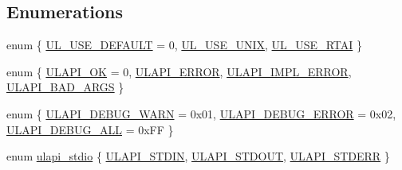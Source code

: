 \subsection*{Enumerations}
\begin{DoxyCompactItemize}
\item 
enum \{ \hyperlink{ulapi_8hh_a06fc87d81c62e9abb8790b6e5713c55ba27b52d695698881384f23e88795fa688}{UL\_\-USE\_\-DEFAULT} =  0, 
\hyperlink{ulapi_8hh_a06fc87d81c62e9abb8790b6e5713c55bad498b6be6030a0250ad5baf641515775}{UL\_\-USE\_\-UNIX}, 
\hyperlink{ulapi_8hh_a06fc87d81c62e9abb8790b6e5713c55baef402ddc600d279d3b50110a8033f22e}{UL\_\-USE\_\-RTAI}
 \}
\item 
enum \{ \hyperlink{ulapi_8hh_adf764cbdea00d65edcd07bb9953ad2b7a45185f329ea15aa7a15d7153956e8e8b}{ULAPI\_\-OK} =  0, 
\hyperlink{ulapi_8hh_adf764cbdea00d65edcd07bb9953ad2b7a0d49444592f72eceb55ce10caac632e0}{ULAPI\_\-ERROR}, 
\hyperlink{ulapi_8hh_adf764cbdea00d65edcd07bb9953ad2b7a61d1acf086e7dcaa5efe3532096e8661}{ULAPI\_\-IMPL\_\-ERROR}, 
\hyperlink{ulapi_8hh_adf764cbdea00d65edcd07bb9953ad2b7a30ff306ab59b410e5c86aef3728cdf81}{ULAPI\_\-BAD\_\-ARGS}
 \}
\item 
enum \{ \hyperlink{ulapi_8hh_a99fb83031ce9923c84392b4e92f956b5a37642631e7d37af27695dc0d3169c889}{ULAPI\_\-DEBUG\_\-WARN} =  0x01, 
\hyperlink{ulapi_8hh_a99fb83031ce9923c84392b4e92f956b5a700cc5844df13377374936342ac9f842}{ULAPI\_\-DEBUG\_\-ERROR} =  0x02, 
\hyperlink{ulapi_8hh_a99fb83031ce9923c84392b4e92f956b5a89bf7a468c86ac28240c2e9dccf49b9d}{ULAPI\_\-DEBUG\_\-ALL} =  0xFF
 \}
\item 
enum \hyperlink{ulapi_8hh_a29ec6f0aae96259128c9e278adb6aa19}{ulapi\_\-stdio} \{ \hyperlink{ulapi_8hh_a29ec6f0aae96259128c9e278adb6aa19a4de3a291ccc9dbb17073593a3a4fc7c6}{ULAPI\_\-STDIN}, 
\hyperlink{ulapi_8hh_a29ec6f0aae96259128c9e278adb6aa19a1251079b1c03304c71c4abf9b286c193}{ULAPI\_\-STDOUT}, 
\hyperlink{ulapi_8hh_a29ec6f0aae96259128c9e278adb6aa19a36277b92fddd7acd6960c8b59902a886}{ULAPI\_\-STDERR}
 \}
\end{DoxyCompactItemize}
